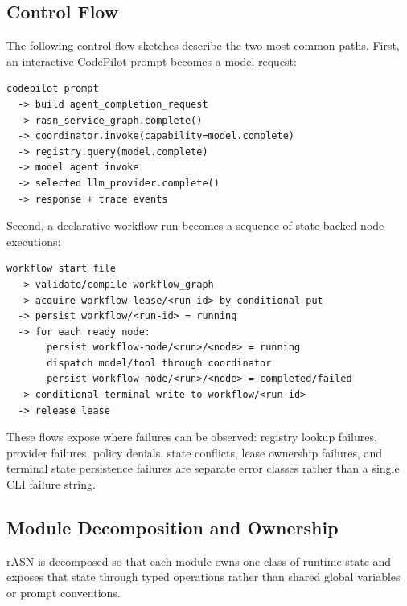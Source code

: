 \documentclass[manuscript,screen,review]{acmart}
\newcommand{\rasn}{rASN\xspace}
\begin{document}
\subsection{Control Flow}

The following control-flow sketches describe the two most common paths. First,
an interactive CodePilot prompt becomes a model request:

\begin{lstlisting}
codepilot prompt
  -> build agent_completion_request
  -> rasn_service_graph.complete()
  -> coordinator.invoke(capability=model.complete)
  -> registry.query(model.complete)
  -> model agent invoke
  -> selected llm_provider.complete()
  -> response + trace events
\end{lstlisting}

Second, a declarative workflow run becomes a sequence of state-backed node
executions:

\begin{lstlisting}
workflow start file
  -> validate/compile workflow_graph
  -> acquire workflow-lease/<run-id> by conditional put
  -> persist workflow/<run-id> = running
  -> for each ready node:
       persist workflow-node/<run>/<node> = running
       dispatch model/tool through coordinator
       persist workflow-node/<run>/<node> = completed/failed
  -> conditional terminal write to workflow/<run-id>
  -> release lease
\end{lstlisting}

These flows expose where failures can be observed: registry lookup failures,
provider failures, policy denials, state conflicts, lease ownership failures,
and terminal state persistence failures are separate error classes rather than a
single CLI failure string.

\subsection{Module Decomposition and Ownership}

\rasn is decomposed so that each module owns one class of runtime state and
exposes that state through typed operations rather than shared global variables
or prompt conventions.
\end{document}
